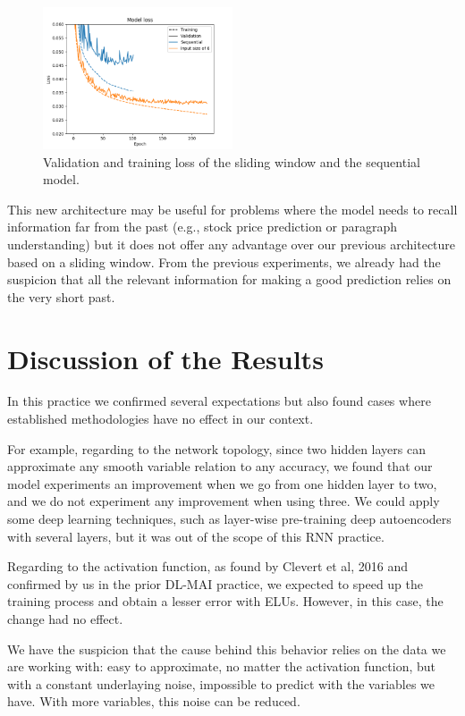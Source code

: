 \documentclass[]{article}
\begin{document}
\begin{figure}[H]
	\centering
	\includegraphics[width=0.5\textwidth]{architecture2}
	\caption{Validation and training loss of the sliding window and the sequential model.}
	\label{f:architecture2}
\end{figure}

This new architecture may be useful for problems where the model needs to recall information far from the past (e.g., stock price prediction or paragraph understanding) but it does not offer any advantage over our previous architecture based on a sliding window. From the previous experiments, we already had the suspicion that all the relevant information for making a good prediction relies on the very short past.

\section{Discussion of the Results}

In this practice we confirmed several expectations but also found cases where established methodologies have no effect in our context.

For example, regarding to the network topology, since two hidden layers can approximate any smooth variable relation to any accuracy, we found that our model experiments an improvement when we go from one hidden layer to two, and we do not experiment any improvement when using three. We could apply some deep learning techniques, such as layer-wise pre-training deep autoencoders with several layers, but it was out of the scope of this RNN practice.

Regarding to the activation function, as found by Clevert et al, 2016 and confirmed by us in the prior DL-MAI practice, we expected to speed up the training process and obtain a lesser error with ELUs. However, in this case, the change had no effect.

We have the suspicion that the cause behind this behavior relies on the data we are working with: easy to approximate, no matter the activation function, but with a constant underlaying noise, impossible to predict with the variables we have. With more variables, this noise can be reduced.
\end{document}
